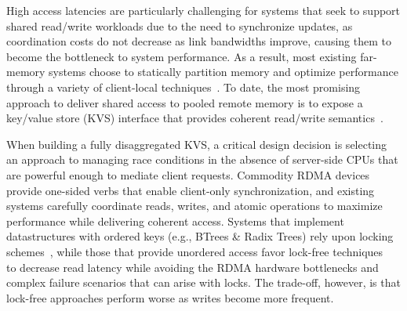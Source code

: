 High access latencies are particularly challenging for systems that
seek to support shared read/write workloads due to the need to
synchronize updates, as coordination costs do not decrease as link bandwidths improve, causing them to become the bottleneck to system performance.
As a result, most existing far-memory systems choose to statically
partition memory and optimize performance through a
variety of client-local techniques~\cite{kona,mira,aifm,trackfm,carbink}.
To date, the most promising approach to deliver shared access to
pooled remote memory is to expose a key/value store (KVS) interface that
provides coherent read/write
semantics~\cite{rolex,smart,ditto,fusee,clover,sherman,ford}.

When building a fully disaggregated KVS, a critical design
decision is selecting an approach to managing race conditions in the
absence of server-side CPUs that are powerful enough to mediate client
requests.
Commodity RDMA devices provide one-sided verbs that enable client-only
synchronization, and existing systems carefully coordinate reads,
writes, and atomic operations to maximize performance while delivering
coherent access.  Systems that implement datastructures with ordered
keys (e.g., BTrees \& Radix Trees) rely upon locking
schemes~\cite{smart,sherman}, while those that provide unordered
access favor lock-free techniques~\cite{rolex,ditto,fusee,clover} to
decrease read latency while avoiding the RDMA hardware bottlenecks and complex
failure scenarios that can arise with locks.  The trade-off, however,
is that lock-free approaches perform worse as writes become more
frequent.

